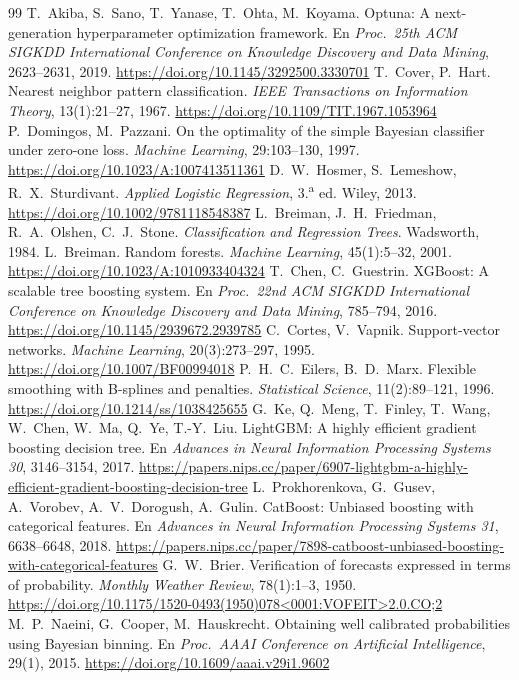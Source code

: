 \documentclass[11pt,a4paper]{article}
\newcommand{\doi}[1]{\url{https://doi.org/#1}}
\begin{document}
\begin{thebibliography}{99}
 T.~Akiba, S.~Sano, T.~Yanase, T.~Ohta, M.~Koyama. Optuna: A next-generation hyperparameter optimization framework. En \emph{Proc.\ 25th ACM SIGKDD International Conference on Knowledge Discovery and Data Mining}, 2623--2631, 2019. \doi{10.1145/3292500.3330701}
 T.~Cover, P.~Hart. Nearest neighbor pattern classification. \emph{IEEE Transactions on Information Theory}, 13(1):21--27, 1967. \doi{10.1109/TIT.1967.1053964}
 P.~Domingos, M.~Pazzani. On the optimality of the simple Bayesian classifier under zero-one loss. \emph{Machine Learning}, 29:103--130, 1997. \doi{10.1023/A:1007413511361}
 D.~W.~Hosmer, S.~Lemeshow, R.~X.~Sturdivant. \emph{Applied Logistic Regression}, 3.\textsuperscript{a} ed. Wiley, 2013. \doi{10.1002/9781118548387}
 L.~Breiman, J.~H.~Friedman, R.~A.~Olshen, C.~J.~Stone. \emph{Classification and Regression Trees}. Wadsworth, 1984.
 L.~Breiman. Random forests. \emph{Machine Learning}, 45(1):5--32, 2001. \doi{10.1023/A:1010933404324}
 T.~Chen, C.~Guestrin. XGBoost: A scalable tree boosting system. En \emph{Proc.\ 22nd ACM SIGKDD International Conference on Knowledge Discovery and Data Mining}, 785--794, 2016. \doi{10.1145/2939672.2939785}
 C.~Cortes, V.~Vapnik. Support-vector networks. \emph{Machine Learning}, 20(3):273--297, 1995. \doi{10.1007/BF00994018}
 P.~H.~C.~Eilers, B.~D.~Marx. Flexible smoothing with B-splines and penalties. \emph{Statistical Science}, 11(2):89--121, 1996. \doi{10.1214/ss/1038425655}
 G.~Ke, Q.~Meng, T.~Finley, T.~Wang, W.~Chen, W.~Ma, Q.~Ye, T.-Y.~Liu. LightGBM: A highly efficient gradient boosting decision tree. En \emph{Advances in Neural Information Processing Systems 30}, 3146--3154, 2017. \url{https://papers.nips.cc/paper/6907-lightgbm-a-highly-efficient-gradient-boosting-decision-tree}
 L.~Prokhorenkova, G.~Gusev, A.~Vorobev, A.~V.~Dorogush, A.~Gulin. CatBoost: Unbiased boosting with categorical features. En \emph{Advances in Neural Information Processing Systems 31}, 6638--6648, 2018. \url{https://papers.nips.cc/paper/7898-catboost-unbiased-boosting-with-categorical-features}
 G.~W.~Brier. Verification of forecasts expressed in terms of probability. \emph{Monthly Weather Review}, 78(1):1--3, 1950. \doi{10.1175/1520-0493(1950)078<0001:VOFEIT>2.0.CO;2}
 M.~P.~Naeini, G.~Cooper, M.~Hauskrecht. Obtaining well calibrated probabilities using Bayesian binning. En \emph{Proc.\ AAAI Conference on Artificial Intelligence}, 29(1), 2015. \doi{10.1609/aaai.v29i1.9602}

\end{thebibliography}
\end{document}
